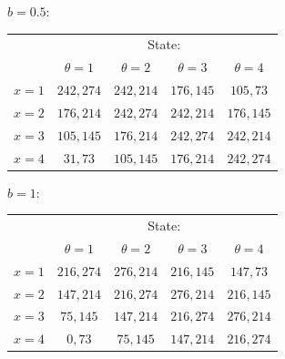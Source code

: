 \documentclass{beamer}
\begin{document}
\begin{frame}
\begin{card}[Treatment]
$b=0.5$:

\begin{center}
	\begin{tabular}{r|c|c|c|c|} 
			\multicolumn{1}{r}{ }& \multicolumn{4}{c}{State:}		\\
			\multicolumn{1}{r}{ }& \multicolumn{1}{c}{$\theta=1$}  & \multicolumn{1}{c}{$\theta=2$} & \multicolumn{1}{c}{$\theta=3$}& \multicolumn{1}{c}{$\theta=4$} \\ \cline{2-5}
			$x=1$ &  $242,274$ & $242,214$  & $176,145$ & $105,73$  \\ \cline{2-5}
			$x=2$ &  $176,214$ & $242,274$  & $242,214$ & $176,145$ \\ \cline{2-5}
			$x=3$ &  $105,145$ & $176,214$  & $242,274$ & $242,214$  \\ \cline{2-5}
			$x=4$ &  $31,73$   & $105,145$  & $176,214$ & $242,274$    \\ \cline{2-5}
		\end{tabular}
	\end{center}
\end{card}
\end{frame}

\begin{frame}
\begin{card}[Treatment]
$b=1$:

\begin{center}
	\begin{tabular}{r|c|c|c|c|} 
			\multicolumn{1}{r}{ }& \multicolumn{4}{c}{State:}		\\
			\multicolumn{1}{r}{ }& \multicolumn{1}{c}{$\theta=1$}  & \multicolumn{1}{c}{$\theta=2$} & \multicolumn{1}{c}{$\theta=3$}& \multicolumn{1}{c}{$\theta=4$} \\ \cline{2-5}
			$x=1$ &  $216,274$ & $276,214$  & $216,145$ & $147,73$  \\ \cline{2-5}
			$x=2$ &  $147,214$ & $216,274$  & $276,214$ & $216,145$ \\ \cline{2-5}
			$x=3$ &  $75,145$  & $147,214$  & $216,274$ & $276,214$  \\ \cline{2-5}
			$x=4$ &  $0,73$    & $75,145$   & $147,214$ & $216,274$    \\ \cline{2-5}
		\end{tabular}
	\end{center}
\end{card}
\end{frame}
\end{document}
